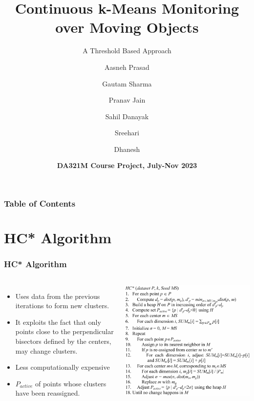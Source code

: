 \documentclass{beamer}
\title[Threshold Based \textit{K}-Means Monitoring] %
{Continuous k-Means Monitoring
over Moving Objects}
\subtitle{A Threshold Based Approach}
\author[Group 7] %
{Aasneh Prasad \and Gautam Sharma \and Pranav Jain \and Sahil Danayak \and Sreehari \and Dhanesh}
\date[16th November 2023] %
{\textbf{DA321M Course Project, July-Nov 2023}}
\begin{document}
\frame{\titlepage}


\begin{frame}
  \frametitle{Table of Contents}
  \tableofcontents
\end{frame}


\section{HC* Algorithm}
\begin{frame}
  \frametitle{HC* Algorithm}

  \begin{columns}

    \begin{itemize}
      \item Uses data from the previous iterations to form new clusters.
      \item  It exploits the fact that only points close to the perpendicular bisectors defined by the centers, may change clusters.
      \item Less computationally expensive
      \item $P_{active}$ of points whose clusters have been reassigned.

    \end{itemize}

    \includegraphics[width=1\textwidth]{Pic1.png}

  \end{columns}
\end{frame}
\end{document}
